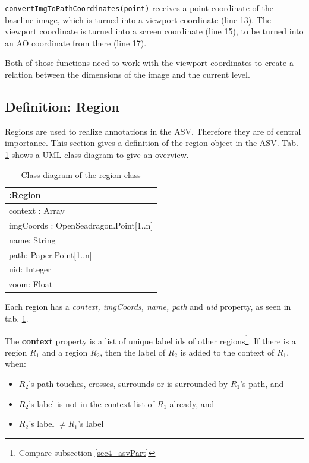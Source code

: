 \texttt{convertImgToPathCoordinates(point)} receives a point coordinate of the baseline image, which is turned into a viewport coordinate (line 13). The viewport coordinate is turned into a screen coordinate (line 15), to be turned into an AO coordinate from there (line 17).

Both of those functions need to work with the viewport coordinates to create a relation between the dimensions of the image and the current level.

\subsection{Definition: Region}
\label{sec4_region}
Regions are used to realize annotations in the ASV. Therefore they are of central importance. This section gives a definition of the region object in the ASV. Tab. \ref{tab4_regionUML} shows a UML class diagram to give an overview.

\begin{table}[H]
	\begin{center}
		\begin{tabular}{| p{7cm} |}
			\hline
			\textbf{:Region} \\ \hline
			context : Array\\
			imgCoords : OpenSeadragon.Point[1..n]\\
			name: String\\
			path: Paper.Point[1..n]\\
			uid: Integer\\
			zoom: Float\\ \hline
		\end{tabular}
		\caption{Class diagram of the region class}
		\label{tab4_regionUML}
	\end{center}
\end{table}

Each region has a \emph{context, imgCoords, name, path} and \emph{uid} property, as seen in tab. \ref{tab4_regionUML}.

The \textbf{context} property is a list of unique label ids of other regions\footnote{
	Compare subsection \ref{sec4_asvPart}
}. If there is a region $R_1$ and a region $R_2$, then the label of $R_2$ is added to the context of $R_1$, when:
\begin{itemize}
	\item $R_2$'s path touches, crosses, surrounds or is surrounded by $R_1$'s path, and
	\item $R_2$'s label is not in the context list of $R_1$ already, and
	\item $R_2$'s label $\neq R_1$'s label
\end{itemize}

